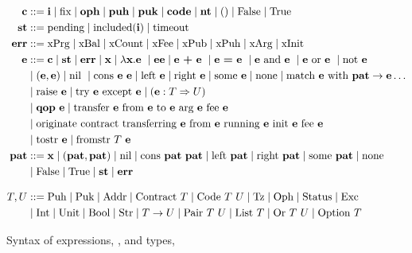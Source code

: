 \documentclass[a4paper]{llncs}
\begin{document}
\begin{figure}[tp]
\begin{align*}
  \CONSTANT & ::= \INT \mid \FIX
              \mid \OPH \mid \PUH \mid\PUK \mid \CODE \mid
              \NTEZ \mid \SUNIT \mid \FALSE \mid \TRUE \\
  \STATUS & ::= \STATUSPENDING \mid \STATUSINCLUDING (\INT) \mid
            \STATUSTIMEOUT \\
  \ERROR &::= \ERRPRG \mid \ERRBAL \mid \ERRCOUNT \mid \ERRFEE \mid
           \ERRPUK \mid \ERRPUH \mid \ERRARG \mid \ERRINIT\\
	\EXPR & :: =  \CONSTANT \mid \STATUS \mid \ERROR \mid \VARIABLE \mid \lambda \VARIABLE. \EXPR\ 
	\mid \EXPR\EXPR  %
  \mid \EXPR\ \PLUS\ \EXPR\ \mid
  \EXPR\ \EQUAL\ \EXPR\
  \mid \EXPR\ \AND\ \EXPR\ \mid \EXPR\ \OR\ \EXPR\ \mid \NOT\ \EXPR
  \\& \mid (\EXPR,\EXPR)\mid \NIL\ \mid \CONS\ \EXPR\ \EXPR \mid \LEFT\ \EXPR \mid\RIGHT\
  \EXPR \mid \SOME\ \EXPR \mid \NONE
  \mid \MATCH\ \EXPR\ \WITH\ \PATTERN\to\EXPR \dots 
  \\& \mid \RAISE\ \EXPR \mid \TRY\ \EXPR\ \EXCEPT\ \EXPR \mid \CAST\EXPR\TYPE\TYPEU
  \\& \mid \QOP\  \EXPR \mid \TRANSFER[\EXPR]\EXPR\EXPR\EXPR\EXPR
  \\& \mid \ORIGINATE\EXPR\EXPR\EXPR\EXPR\EXPR
  \\& \mid \TOSTRING\ \EXPR \mid \FROMSTRING\ \TYPE\ \EXPR
  \\
  \PATTERN &::= \VARIABLE \mid (\PATTERN, \PATTERN) \mid \NIL \mid \CONS\ \PATTERN\ \PATTERN \mid \LEFT\ \PATTERN \mid\RIGHT\
             \PATTERN \mid \SOME\ \PATTERN \mid \NONE \\
            &\mid \FALSE \mid \TRUE \mid \STATUS \mid \ERROR
  \\[2ex]
  \TYPE, \TYPEU & ::=
                  \TPUH \mid
                  \TPUK \mid
                  \TADDR \mid 
                  \TCONTRACT\ \TYPE \mid
                  \TCODE\ \TYPE\ \TYPEU \mid \TTEZ \mid
                  \TOPH \mid
                  \TSTATUS \mid \TEXCEPTION \\
  & \mid \TINT \mid \TUNIT \mid \TBOOL \mid \TSTRING \mid \TYPE\to\TYPEU \mid \TPAIR\ \TYPE\ \TYPEU \mid \TLIST\ \TYPE
    \mid \TSUM\ \TYPE\ \TYPEU \mid \TOPTION\ \TYPE 
\end{align*}
  \caption{Syntax of expressions, \EXPR, and types, \TYPE}
  \label{fig:syntax-expressions}
\end{figure}
\end{document}
